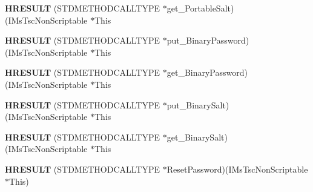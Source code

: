 \begin{DoxyCompactItemize}
\mbox{\label{struct_i_ms_tsc_non_scriptable_vtbl_a3033a70f391028d18bb320103570c6a3}} 
{\bfseries H\+R\+E\+S\+U\+LT} (S\+T\+D\+M\+E\+T\+H\+O\+D\+C\+A\+L\+L\+T\+Y\+PE $\ast$get\+\_\+\+Portable\+Salt)(I\+Ms\+Tsc\+Non\+Scriptable $\ast$This
\item 
\mbox{\label{struct_i_ms_tsc_non_scriptable_vtbl_a5f60e364179066e73bf9e2a9bb6bde58}} 
{\bfseries H\+R\+E\+S\+U\+LT} (S\+T\+D\+M\+E\+T\+H\+O\+D\+C\+A\+L\+L\+T\+Y\+PE $\ast$put\+\_\+\+Binary\+Password)(I\+Ms\+Tsc\+Non\+Scriptable $\ast$This
\item 
\mbox{\label{struct_i_ms_tsc_non_scriptable_vtbl_a9d642c188a1148f01752c1917e3d8543}} 
{\bfseries H\+R\+E\+S\+U\+LT} (S\+T\+D\+M\+E\+T\+H\+O\+D\+C\+A\+L\+L\+T\+Y\+PE $\ast$get\+\_\+\+Binary\+Password)(I\+Ms\+Tsc\+Non\+Scriptable $\ast$This
\item 
\mbox{\label{struct_i_ms_tsc_non_scriptable_vtbl_ab5f65e88d836cfb8970e1b2a191ee7e5}} 
{\bfseries H\+R\+E\+S\+U\+LT} (S\+T\+D\+M\+E\+T\+H\+O\+D\+C\+A\+L\+L\+T\+Y\+PE $\ast$put\+\_\+\+Binary\+Salt)(I\+Ms\+Tsc\+Non\+Scriptable $\ast$This
\item 
\mbox{\label{struct_i_ms_tsc_non_scriptable_vtbl_aac1beac908e94f2d8965c2e8be87ecfd}} 
{\bfseries H\+R\+E\+S\+U\+LT} (S\+T\+D\+M\+E\+T\+H\+O\+D\+C\+A\+L\+L\+T\+Y\+PE $\ast$get\+\_\+\+Binary\+Salt)(I\+Ms\+Tsc\+Non\+Scriptable $\ast$This
\item 
\mbox{\label{struct_i_ms_tsc_non_scriptable_vtbl_a093824ddf14dc89d21eb0321d49aa436}} 
{\bfseries H\+R\+E\+S\+U\+LT} (S\+T\+D\+M\+E\+T\+H\+O\+D\+C\+A\+L\+L\+T\+Y\+PE $\ast$Reset\+Password)(I\+Ms\+Tsc\+Non\+Scriptable $\ast$This)
\end{DoxyCompactItemize}
